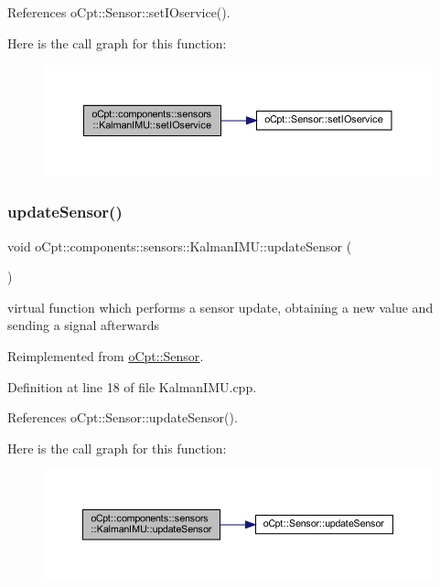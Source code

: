 References o\+Cpt\+::\+Sensor\+::set\+I\+Oservice().

Here is the call graph for this function\+:
\nopagebreak
\begin{figure}[H]
\begin{center}
\leavevmode
\includegraphics[width=350pt]{classo_cpt_1_1components_1_1sensors_1_1_kalman_i_m_u_a21cf83dfed3bd1c5a164bb847d25f426_cgraph}
\end{center}
\end{figure}
\hypertarget{classo_cpt_1_1components_1_1sensors_1_1_kalman_i_m_u_acc4f666db05d6355772a67ae2f06faef}{}\label{classo_cpt_1_1components_1_1sensors_1_1_kalman_i_m_u_acc4f666db05d6355772a67ae2f06faef} 
\subsubsection{\texorpdfstring{update\+Sensor()}{updateSensor()}}
{\footnotesize\ttfamily void o\+Cpt\+::components\+::sensors\+::\+Kalman\+I\+M\+U\+::update\+Sensor (\begin{DoxyParamCaption}{ }\end{DoxyParamCaption})\hspace{0.3cm}{\ttfamily [virtual]}}

virtual function which performs a sensor update, obtaining a new value and sending a signal afterwards 

Reimplemented from \hyperlink{classo_cpt_1_1_sensor_ab4b0dedb06f11bcf2368852035beb2b2}{o\+Cpt\+::\+Sensor}.



Definition at line 18 of file Kalman\+I\+M\+U.\+cpp.



References o\+Cpt\+::\+Sensor\+::update\+Sensor().

Here is the call graph for this function\+:
\nopagebreak
\begin{figure}[H]
\begin{center}
\leavevmode
\includegraphics[width=350pt]{classo_cpt_1_1components_1_1sensors_1_1_kalman_i_m_u_acc4f666db05d6355772a67ae2f06faef_cgraph}
\end{center}
\end{figure}


